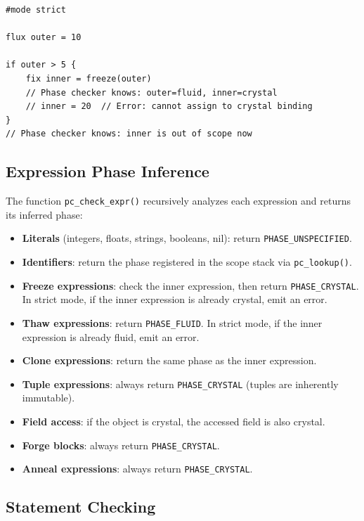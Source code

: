 \begin{lstlisting}[language=Lattice, caption={Phase tracking through scopes}]
#mode strict

flux outer = 10

if outer > 5 {
    fix inner = freeze(outer)
    // Phase checker knows: outer=fluid, inner=crystal
    // inner = 20  // Error: cannot assign to crystal binding
}
// Phase checker knows: inner is out of scope now
\end{lstlisting}

\subsection{Expression Phase Inference}

The function \lstinline|pc_check_expr()| recursively analyzes each expression and returns its inferred phase:

\begin{itemize}
  \item \textbf{Literals} (integers, floats, strings, booleans, nil): return \lstinline|PHASE_UNSPECIFIED|.
  \item \textbf{Identifiers}: return the phase registered in the scope stack via \lstinline|pc_lookup()|.
  \item \textbf{Freeze expressions}: check the inner expression, then return \lstinline|PHASE_CRYSTAL|. In strict mode, if the inner expression is already crystal, emit an error.
  \item \textbf{Thaw expressions}: return \lstinline|PHASE_FLUID|. In strict mode, if the inner expression is already fluid, emit an error.
  \item \textbf{Clone expressions}: return the same phase as the inner expression.
  \item \textbf{Tuple expressions}: always return \lstinline|PHASE_CRYSTAL| (tuples are inherently immutable).
  \item \textbf{Field access}: if the object is crystal, the accessed field is also crystal.
  \item \textbf{Forge blocks}: always return \lstinline|PHASE_CRYSTAL|.
  \item \textbf{Anneal expressions}: always return \lstinline|PHASE_CRYSTAL|.
\end{itemize}

\subsection{Statement Checking}

